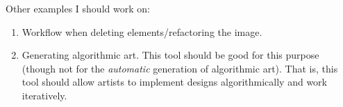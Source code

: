 \documentclass[12pt]{article}
\theoremstyle{remark}
\begin{document}
Other examples I should work on:
\begin{enumerate}
\item Workflow when deleting elements/refactoring the image.
\item Generating algorithmic art. This tool should be good for this purpose (though not for the \textit{automatic} generation of algorithmic art). That is, this tool should allow artists to implement designs algorithmically and work iteratively.
\end{enumerate}
\end{document}

